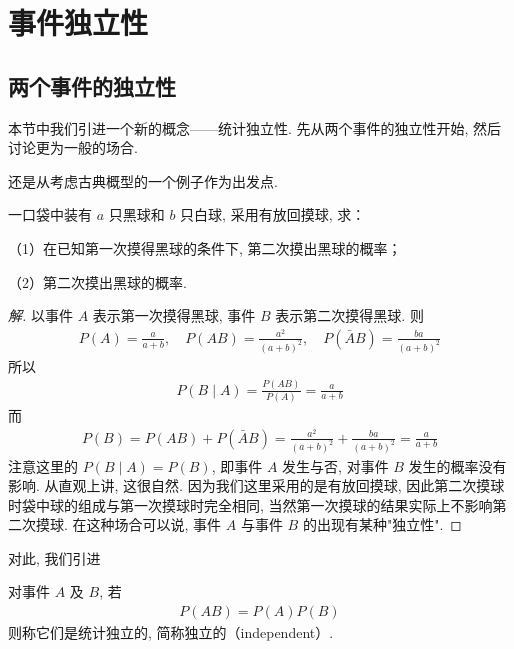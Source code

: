 \documentclass[../../main.tex]{subfiles}
\begin{document}
\section{事件独立性}\label{section:ch02-事件独立性}

\subsection{两个事件的独立性}

本节中我们引进一个新的概念——统计独立性. 先从两个事件的独立性开始, 然后讨论更为一般的场合.

还是从考虑古典概型的一个例子作为出发点.

\begin{example}[有放回摸球]\label{example:ch02-有放回摸球}
一口袋中装有 $a$ 只黑球和 $b$ 只白球, 采用有放回摸球, 求：

（1）在已知第一次摸得黑球的条件下, 第二次摸出黑球的概率；

（2）第二次摸出黑球的概率.

\begin{proof}[解]
以事件 $A$ 表示第一次摸得黑球, 事件 $B$ 表示第二次摸得黑球. 则
\begin{align*}
P(A)=\frac{a}{a+b},\quad P(AB)=\frac{a^2}{(a+b)^2},\quad P(\bar{A}B)=\frac{ba}{(a+b)^2}
\end{align*}
所以
\begin{align*}
P(B\mid A)=\frac{P(AB)}{P(A)}=\frac{a}{a+b}
\end{align*}
而
\begin{align*}
P(B)=P(AB)+P(\bar{A}B)=\frac{a^2}{(a+b)^2}+\frac{ba}{(a+b)^2}=\frac{a}{a+b}
\end{align*}
注意这里的 $P(B\mid A)=P(B)$, 即事件 $A$ 发生与否, 对事件 $B$ 发生的概率没有影响. 从直观上讲, 这很自然. 因为我们这里采用的是有放回摸球, 因此第二次摸球时袋中球的组成与第一次摸球时完全相同, 当然第一次摸球的结果实际上不影响第二次摸球. 在这种场合可以说, 事件 $A$ 与事件 $B$ 的出现有某种"独立性".
\end{proof}
\end{example}

对此, 我们引进

\begin{definition}[事件的独立性]\label{definition:ch02-事件独立性}
对事件 $A$ 及 $B$, 若
\begin{align}\label{align:ch02-两事件独立定义}
P(AB)=P(A)P(B)
\end{align}
则称它们是统计独立的, 简称独立的（independent）.
\end{definition}
\end{document}
